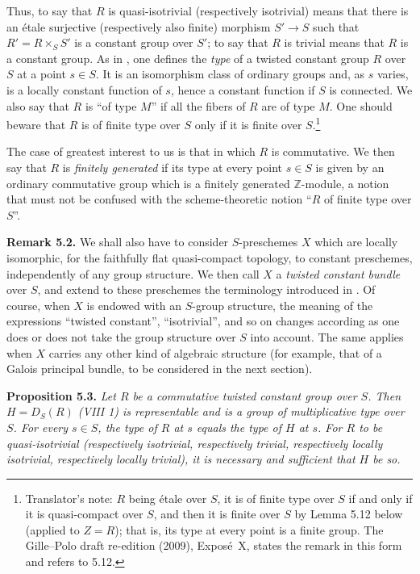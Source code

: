 Thus, to say that \(R\) is quasi-isotrivial (respectively isotrivial) means
that there is an étale surjective (respectively also finite) morphism
\(S'\to S\) such that \(R'=R\times_S S'\) is a constant group over \(S'\);
to say that \(R\) is trivial means that \(R\) is a constant group. As in
, one defines the \emph{type} of a twisted constant group
\(R\) over \(S\) at a point \(s\in S\). It is an isomorphism class of
ordinary groups and, as \(s\) varies, is a locally constant function of
\(s\), hence a constant function if \(S\) is connected. We also say that
\(R\) is ``of type \(M\)'' if all the fibers of \(R\) are of type \(M\).
One should beware that \(R\) is of finite type over \(S\) only if it is
finite over \(S\).\footnote{Translator's note: \(R\) being étale over \(S\),
it is of finite type over \(S\) if and only if it is quasi-compact over
\(S\), and then it is finite over \(S\) by Lemma 5.12 below (applied to
\(Z=R\)); that is, its type at every point is a finite group. The
Gille--Polo draft re-edition (2009), Expos\'e~X, states the remark in this
form and refers to 5.12.}

The case of greatest interest to us is that in which \(R\) is
commutative. We then say that \(R\) is \emph{finitely generated} if its
type at every point \(s\in S\) is given by an ordinary commutative group
which is a finitely generated \(\mathbb Z\)-module, a notion that must not be
confused with the scheme-theoretic notion ``\(R\) of finite type over
\(S\)''.

\par\medskip\noindent
\textbf{Remark 5.2.}\enspace
We shall also have to consider \(S\)-preschemes \(X\) which are locally
isomorphic, for the faithfully flat quasi-compact topology, to constant
preschemes, independently of any group structure. We then call \(X\) a
\emph{twisted constant bundle} over \(S\), and extend to these preschemes
the terminology introduced in . Of course, when \(X\) is endowed with an
\(S\)-group structure, the meaning of the expressions ``twisted constant'',
``isotrivial'', and so on changes according as one does or does not take the
group structure over \(S\) into account. The same applies when \(X\)
carries any other kind of algebraic structure (for example, that of a
Galois principal bundle, to be considered in the next section).

\par\medskip\noindent
\textbf{Proposition 5.3.}\enspace
\begingroup\itshape
Let \(R\) be a commutative twisted constant group over \(S\). Then
\(H=D_S(R)\) \textup{(}VIII 1\textup{)} is representable and is a group of
multiplicative type over \(S\). For every \(s\in S\), the type of \(R\) at
\(s\) equals the type of \(H\) at \(s\). For \(R\) to be quasi-isotrivial
\textup{(}respectively isotrivial, respectively trivial, respectively
locally isotrivial, respectively locally trivial\textup{)}, it is necessary
and sufficient that \(H\) be so.
\par\endgroup


